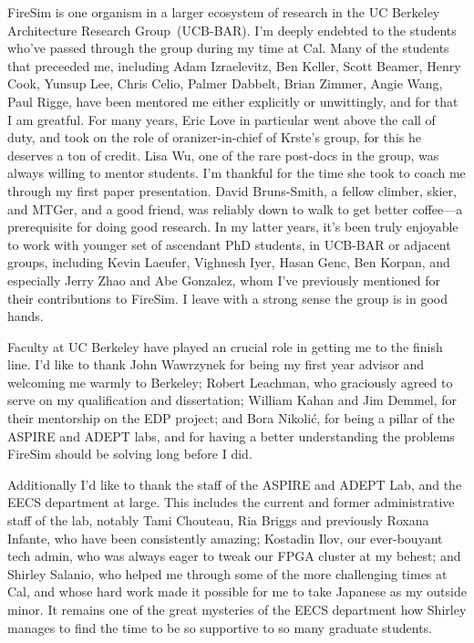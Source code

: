 FireSim is one organism in a larger ecosystem of research in the UC Berkeley
Architecture Research Group~(UCB-BAR). I'm deeply endebted to the students
who've passed through the group during my time at Cal. Many of the students
that preceeded me, including Adam Izraelevitz, Ben Keller, Scott Beamer, Henry
Cook, Yunsup Lee, Chris Celio, Palmer Dabbelt, Brian Zimmer, Angie Wang, Paul
Rigge, have been mentored me either explicitly or unwittingly, and for that I
am greatful. For many years, Eric Love in particular went above the call of
duty, and took on the role of oranizer-in-chief of Krste's group, for this he
deserves a ton of credit. Lisa Wu, one of the rare post-docs in the group, was
always willing to mentor students. I'm thankful for the time she took to coach
me through my first paper presentation. David Bruns-Smith, a fellow climber,
skier, and MTGer, and a good friend, was reliably down to walk to get better
coffee---a prerequisite for doing good research. In my latter years, it's been
truly enjoyable to work with younger set of ascendant PhD students, in UCB-BAR
or adjacent groups, including Kevin Laeufer, Vighnesh Iyer, Hasan Genc, Ben
Korpan, and especially Jerry Zhao and Abe Gonzalez, whom I've previously
mentioned for their contributions to FireSim.  I leave with a strong sense the
group is in good hands.

Faculty at UC Berkeley have played an crucial role in getting me to
the finish line. I'd like to thank John Wawrzynek for being my first year
advisor and welcoming me warmly to Berkeley; Robert Leachman, who graciously
agreed to serve on my qualification and dissertation; William Kahan and Jim
Demmel, for their mentorship on the EDP project; and Bora Nikoli\'c, for being a
pillar of the ASPIRE and ADEPT labs, and for having a better understanding the
problems FireSim should be solving long before I did.

Additionally I'd like to thank the staff of the ASPIRE and ADEPT Lab, and the
EECS department at large. This includes the current and former administrative
staff of the lab, notably Tami Chouteau, Ria Briggs and previously Roxana
Infante, who have been consistently amazing; Kostadin Ilov, our ever-bouyant
tech admin, who was always eager to tweak our FPGA cluster at my behest; and
Shirley Salanio, who helped me through some of the more challenging times at
Cal, and whose hard work made it possible for me to take Japanese as my outside
minor. It remains one of the great mysteries of the EECS department how Shirley
manages to find the time to be so supportive to so many graduate students.

